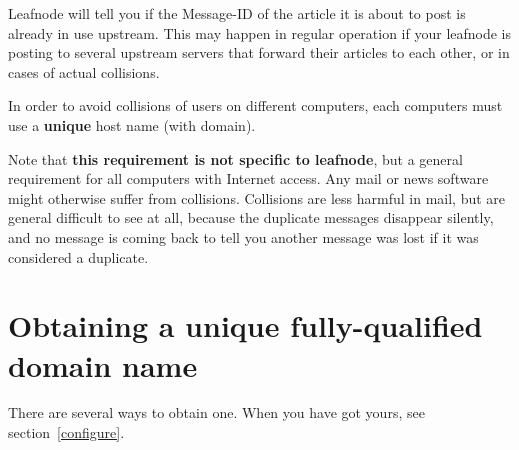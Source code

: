 \documentclass[10pt,english,a5paper]{article}
\begin{document}
Leafnode will tell you if the Message-ID of the article it is about to
post is already in use upstream. This may happen in regular operation if
your leafnode is posting to several upstream servers that forward their
articles to each other, or in cases of actual collisions.

In order to avoid collisions of users on different computers, each
computers must use a \textbf{unique} host name (with domain).

Note that \textbf{this requirement is not specific to leafnode}, but
a general requirement for all computers with Internet access. Any mail or
news software might otherwise suffer from collisions. Collisions are
less harmful in mail, but are general difficult to see at all, because
the duplicate messages disappear silently, and no message is coming back
to tell you another message was lost if it was considered a duplicate.

\section{Obtaining a unique fully-qualified domain name}

There are several ways to obtain one. When you have got yours, see
section~\ref{configure}.
\end{document}
